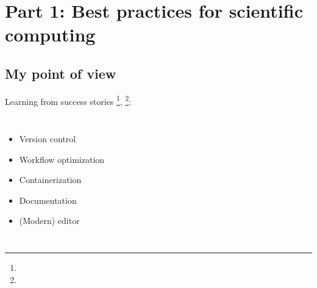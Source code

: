\documentclass[usenames,dvipsnames]{beamer}
\theoremstyle{plain}
\theoremstyle{definition}
\begin{document}
\section{Part 1: Best practices for scientific computing}
\subsection{My point of view}

\begin{frame}{\setframetitle{}}
  Learning from success stories  \footnote{}, \footnote{}:
  
  \begin{columns}[t]
    
    \begin{itemize}
      \item Version control 
      
      \item Workflow optimization
      
      \item Containerization
      
      \item Documentation
      
      \item (Modern) editor
    \end{itemize}
    
  \end{columns}
  
\end{frame}



\end{document}
